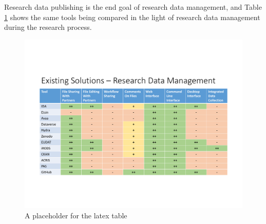 Research data publishing is the end goal of research data management, and
Table \ref{fig:management} shows the same tools being compared in the light
of research data management during the research process.

\begin{figure}
    \begin{centering}
        \includegraphics[width=\textwidth]{images/management}
    \end{centering}
    \caption{A placeholder for the latex table}
    \label{fig:management}
\end{figure}

